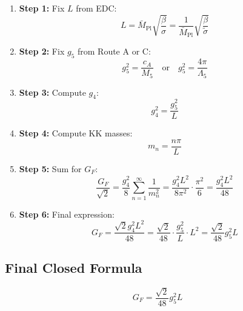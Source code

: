 \documentclass[11pt,a4paper]{article}
\begin{document}
\begin{enumerate}
\item \textbf{Step 1:} Fix $L$ from EDC:
\begin{equation}
\label{eq:step1-L}
L = \bar{M}_{\text{Pl}} \sqrt{\frac{\beta}{\sigma}} = \frac{1}{\bar{M}_{\text{Pl}}} \sqrt{\frac{\beta}{\tilde{\sigma}}}
\end{equation}

\item \textbf{Step 2:} Fix $g_5$ from Route A or C:
\begin{equation}
\label{eq:step2-g5}
g_5^2 = \frac{c_A}{M_5} \quad \text{or} \quad g_5^2 = \frac{4\pi}{\Lambda_5}
\end{equation}

\item \textbf{Step 3:} Compute $g_4$:
\begin{equation}
\label{eq:step3-g4}
g_4^2 = \frac{g_5^2}{L}
\end{equation}

\item \textbf{Step 4:} Compute KK masses:
\begin{equation}
\label{eq:step4-mn}
m_n = \frac{n\pi}{L}
\end{equation}

\item \textbf{Step 5:} Sum for $G_F$:
\begin{equation}
\label{eq:step5-sum}
\frac{G_F}{\sqrt{2}} = \frac{g_4^2}{8} \sum_{n=1}^{\infty} \frac{1}{m_n^2}
= \frac{g_4^2 L^2}{8\pi^2} \cdot \frac{\pi^2}{6}
= \frac{g_4^2 L^2}{48}
\end{equation}

\item \textbf{Step 6:} Final expression:
\begin{equation}
\label{eq:step6-final}
G_F = \frac{\sqrt{2} g_4^2 L^2}{48} = \frac{\sqrt{2}}{48} \cdot \frac{g_5^2}{L} \cdot L^2 = \frac{\sqrt{2}}{48} g_5^2 L
\end{equation}
\end{enumerate}

\subsection{Final Closed Formula}
\label{subsec:final-formula}

\begin{equation}
\label{eq:gf-final}
\boxed{G_F = \frac{\sqrt{2}}{48} g_5^2 L}
\end{equation}
\end{document}
